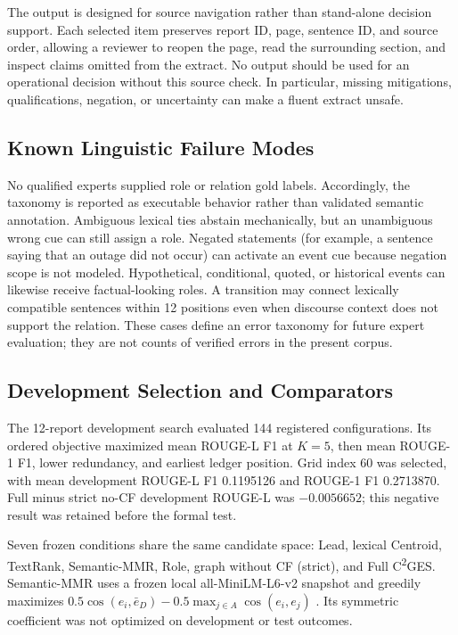 \documentclass[applsci,article,submit,moreauthors]{Definitions/mdpi}
\newcommand{\cges}{C\textsuperscript{2}GES}
\begin{document}
The output is designed for source navigation rather than stand-alone decision support. Each selected item preserves report ID, page, sentence ID, and source order, allowing a reviewer to reopen the page, read the surrounding section, and inspect claims omitted from the extract. No output should be used for an operational decision without this source check. In particular, missing mitigations, qualifications, negation, or uncertainty can make a fluent extract unsafe.

\subsection{Known Linguistic Failure Modes}

No qualified experts supplied role or relation gold labels. Accordingly, the taxonomy is reported as executable behavior rather than validated semantic annotation. Ambiguous lexical ties abstain mechanically, but an unambiguous wrong cue can still assign a role. Negated statements (for example, a sentence saying that an outage did not occur) can activate an event cue because negation scope is not modeled. Hypothetical, conditional, quoted, or historical events can likewise receive factual-looking roles. A transition may connect lexically compatible sentences within 12 positions even when discourse context does not support the relation. These cases define an error taxonomy for future expert evaluation; they are not counts of verified errors in the present corpus.

\subsection{Development Selection and Comparators}

The 12-report development search evaluated 144 registered configurations. Its ordered objective maximized mean ROUGE-L F1 at $K=5$, then mean ROUGE-1 F1, lower redundancy, and earliest ledger position. Grid index 60 was selected, with mean development ROUGE-L F1 0.1195126 and ROUGE-1 F1 0.2713870. Full minus strict no-CF development ROUGE-L was $-0.0056652$; this negative result was retained before the formal test.

Seven frozen conditions share the same candidate space: Lead, lexical Centroid, TextRank, Semantic-MMR, Role, graph without CF (strict), and Full \cges{}. Semantic-MMR uses a frozen local all-MiniLM-L6-v2 snapshot and greedily maximizes $0.5\cos(e_i,\bar e_D)-0.5\max_{j\in A}\cos(e_i,e_j)$ \cite{reimers2019sentencebert}. Its symmetric coefficient was not optimized on development or test outcomes.
\end{document}

